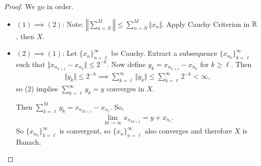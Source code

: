 \documentclass{report}
\begin{document}
\newpage 
{}
\begin{proof}
    We go in order.
    \begin{itemize}
        \item $(1) \implies (2)$: Note: $\left\Vert \sum_{n=N}^M\right\Vert \leq \sum_{n=N}^M \Vert x_n \Vert$. Apply Cauchy Criterion in $\RR$, then $X$.
        \item $(2) \implies (1)$: Let $\{x_n\}_{n=\ell}^\infty$ be Cauchy. Extract a subsequence $\{x_{n_k}\}_{k=\ell}^\infty$ such that $\Vert x_{n_{k+1}} - x_{n_k}\Vert \leq 2^{-k}$. Now define $y_k = x_{n_{k+1}} - x_{n_k}$ for $k \geq \ell$. Then 
        \begin{align*}
            \Vert y_k \Vert  \leq 2^{-k} \implies \sum_{k=\ell}^\infty \Vert y_k\Vert \leq \sum_{k=\ell}^\infty 2^{-k} < \infty,
        \end{align*}
        so (2) implies $\sum_{k=\ell}^\infty y_k = y$ converges in $X$. 

        Then $\sum_{k=\ell}^M y_k = x_{n_{M+1}} - x_{n_{\ell}}$. So, 
        \begin{align*}
            \lim_{M \to \infty} x_{n_{M+1}} = y + x_{n_\ell}.
        \end{align*}
        So $\{x_{n_k}\}_{k=\ell}^\infty$ is convergent, so $\{x_n\}_{n=\ell}^\infty$ also converges and therefore $X$ is Banach.
    \end{itemize}
\end{proof}
\end{document}
